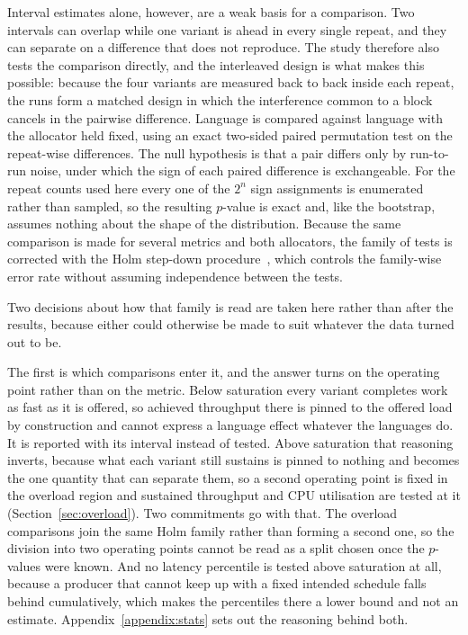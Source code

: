 \documentclass[english,oneside,a4paper,censored,csm,software-track-2020]{HYthesisML}
\begin{document}
Interval estimates alone, however, are a weak basis for a comparison. Two intervals can overlap
while one variant is ahead in every single repeat, and they can separate on a difference that
does not reproduce. The study therefore also tests the comparison directly, and the interleaved
design is what makes this possible: because the four variants are measured back to back inside
each repeat, the runs form a matched design in which the interference common to a block cancels
in the pairwise difference. Language is compared against language with the allocator held
fixed, using an exact two-sided paired permutation test on the repeat-wise differences. The
null hypothesis is that a pair differs only by run-to-run noise, under which the sign of each
paired difference is exchangeable. For the repeat counts used here every one of the $2^{n}$
sign assignments is enumerated rather than sampled, so the resulting $p$-value is exact and,
like the bootstrap, assumes nothing about the shape of the distribution. Because the same
comparison is made for several metrics and both allocators, the family of tests is corrected
with the Holm step-down procedure~\cite{holm1979simple}, which controls the family-wise error
rate without assuming independence between the tests.

Two decisions about how that family is read are taken here rather than after the results,
because either could otherwise be made to suit whatever the data turned out to be.

The first is which comparisons enter it, and the answer turns on the operating point rather than
on the metric. Below saturation every variant completes work as fast as it is offered, so achieved
throughput there is pinned to the offered load by construction and cannot express a language
effect whatever the languages do. It is reported with its interval instead of tested. Above
saturation that reasoning inverts, because what each variant still sustains is pinned to nothing
and becomes the one quantity that can separate them, so a second operating point is fixed in the
overload region and sustained throughput and CPU utilisation are tested at it
(Section~\ref{sec:overload}). Two commitments go with that. The overload comparisons join the same
Holm family rather than forming a second one, so the division into two operating points cannot be
read as a split chosen once the $p$-values were known. And no latency percentile is tested above
saturation at all, because a producer that cannot keep up with a fixed intended schedule falls
behind cumulatively, which makes the percentiles there a lower bound and not an estimate.
Appendix~\ref{appendix:stats} sets out the reasoning behind both.
\end{document}
